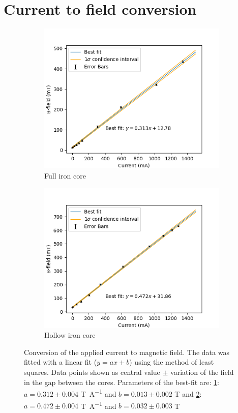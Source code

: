 \documentclass[11pt]{article}
\begin{document}
\section{Current to field conversion}
\begin{figure}[h!]
  \centering
  \begin{subfigure}{0.48\linewidth}
    \includegraphics[width=\linewidth]{IvsB full.png}
    \caption{Full iron core}
    \label{fig:IvsB full}
  \end{subfigure}
  \hfill
  \begin{subfigure}{0.48\linewidth}
    \includegraphics[width=\linewidth]{IvsB hollow.png}
    \caption{Hollow iron core}
    \label{fig:IvsB hollow}
  \end{subfigure}
  \captionsetup{justification=centering}
  \caption{Conversion of the applied current to magnetic field.  The data was fitted with a linear fit ($y = a x + b$) using the method of least squares. Data points shown as central value $\pm$ variation of the field in the gap between the cores. Parameters of the best-fit are: \ref{fig:IvsB full}: $a = 0.312 \pm 0.004 $ \si{T.A^{-1}} and $ b = 0.013 \pm 0.002 $ \si{T} and \ref{fig:IvsB hollow}: $a = 0.472 \pm 0.004 $ \si{T.A^{-1}} and $ b = 0.032 \pm 0.003 $ \si{T}}
  \label{fig:IvsB}
\end{figure}
\end{document}

